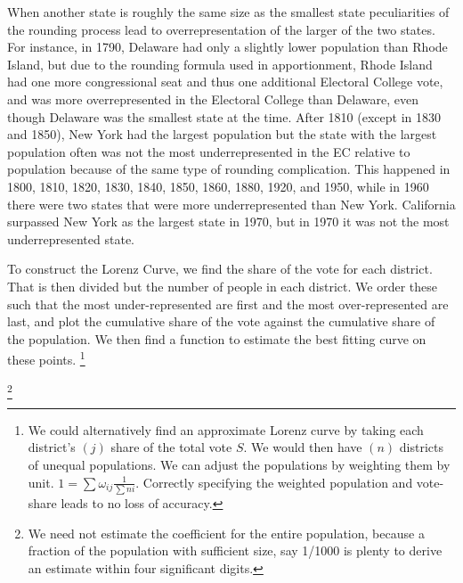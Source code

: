     
    
    When another state is roughly the same size as the smallest state peculiarities of the rounding process lead to overrepresentation of the larger of the two states. For instance, in 1790, Delaware had only a slightly lower population than Rhode Island, but due to the rounding formula used in apportionment, Rhode Island had one more congressional seat and thus one additional Electoral College vote, and was more overrepresented in the Electoral College than Delaware, even though Delaware was the smallest state at the time. After 1810 (except in 1830 and 1850), New York had the largest population but the state with the largest population often was not the most underrepresented in the EC relative to population because of the same type of rounding complication. This happened in 1800, 1810, 1820, 1830, 1840, 1850, 1860, 1880, 1920, and 1950, while in 1960 there were two states that were more underrepresented than New York. California surpassed New York as the largest state in 1970, but in 1970 it was not the most underrepresented state. 
    
    
To construct the Lorenz Curve, we find the share of the vote for each district. That is then divided but the number of people in each district. We order these such that the most under-represented are first and the most over-represented are last, and plot the cumulative share of the vote against the cumulative share of the population. We then find a function to estimate the best fitting curve on these points.
        \footnote{We could alternatively find an approximate Lorenz curve by taking each district's $(j)$ share of the total vote $S$. We would then have $(n)$ districts of unequal populations. We can adjust the populations by weighting them by unit. $1 = \sum{\omega_{ij} \frac{1}{\sum{ni}}}$. Correctly specifying the weighted population and vote-share leads to no loss of accuracy.}
    
        \footnote{We need not estimate the coefficient for the entire population, because a fraction of the population with sufficient size, say 1/1000 is plenty to derive an estimate within four significant digits.}
    
